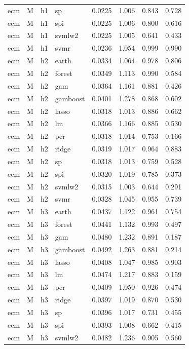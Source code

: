 \begin{ThreePartTable}
\begin{longtable}[t]{llclcccc}
ecm & M & h1 & sp & 0.0225 & 1.006 & 0.843 & 0.728\\
ecm & M & h1 & spi & 0.0225 & 1.006 & 0.800 & 0.616\\
ecm & M & h1 & svmlw2 & 0.0225 & 1.005 & 0.641 & 0.433\\
ecm & M & h1 & svmr & 0.0236 & 1.054 & 0.999 & 0.990\\
\addlinespace
ecm & M & h2 & earth & 0.0334 & 1.064 & 0.978 & 0.806\\
ecm & M & h2 & forest & 0.0349 & 1.113 & 0.990 & 0.584\\
ecm & M & h2 & gam & 0.0364 & 1.161 & 0.881 & 0.426\\
ecm & M & h2 & gamboost & 0.0401 & 1.278 & 0.868 & 0.602\\
ecm & M & h2 & lasso & 0.0318 & 1.013 & 0.886 & 0.662\\
ecm & M & h2 & lm & 0.0366 & 1.166 & 0.885 & 0.530\\
ecm & M & h2 & pcr & 0.0318 & 1.014 & 0.753 & 0.166\\
ecm & M & h2 & ridge & 0.0319 & 1.017 & 0.964 & 0.883\\
ecm & M & h2 & sp & 0.0318 & 1.013 & 0.759 & 0.528\\
ecm & M & h2 & spi & 0.0320 & 1.019 & 0.785 & 0.373\\
ecm & M & h2 & svmlw2 & 0.0315 & 1.003 & 0.644 & 0.291\\
ecm & M & h2 & svmr & 0.0328 & 1.045 & 0.955 & 0.739\\
\addlinespace
ecm & M & h3 & earth & 0.0437 & 1.122 & 0.961 & 0.754\\
ecm & M & h3 & forest & 0.0441 & 1.132 & 0.993 & 0.497\\
ecm & M & h3 & gam & 0.0480 & 1.232 & 0.891 & 0.187\\
ecm & M & h3 & gamboost & 0.0492 & 1.263 & 0.881 & 0.214\\
ecm & M & h3 & lasso & 0.0408 & 1.047 & 0.985 & 0.903\\
ecm & M & h3 & lm & 0.0474 & 1.217 & 0.883 & 0.159\\
ecm & M & h3 & pcr & 0.0409 & 1.050 & 0.926 & 0.474\\
ecm & M & h3 & ridge & 0.0397 & 1.019 & 0.870 & 0.530\\
ecm & M & h3 & sp & 0.0396 & 1.017 & 0.731 & 0.455\\
ecm & M & h3 & spi & 0.0393 & 1.008 & 0.662 & 0.415\\
ecm & M & h3 & svmlw2 & 0.0482 & 1.236 & 0.905 & 0.560\\

\end{longtable}
\end{ThreePartTable}

